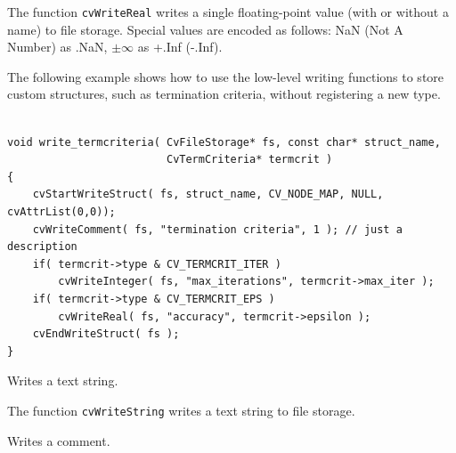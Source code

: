 The function \texttt{cvWriteReal} writes a single floating-point
value (with or without a name) to file storage. Special
values are encoded as follows: NaN (Not A Number) as .NaN, $ \pm \infty $ as +.Inf
(-.Inf).

The following example shows how to use the low-level writing functions
to store custom structures, such as termination criteria, without
registering a new type.

\begin{lstlisting}

void write_termcriteria( CvFileStorage* fs, const char* struct_name,
                         CvTermCriteria* termcrit )
{
    cvStartWriteStruct( fs, struct_name, CV_NODE_MAP, NULL, cvAttrList(0,0));
    cvWriteComment( fs, "termination criteria", 1 ); // just a description
    if( termcrit->type & CV_TERMCRIT_ITER )
        cvWriteInteger( fs, "max_iterations", termcrit->max_iter );
    if( termcrit->type & CV_TERMCRIT_EPS )
        cvWriteReal( fs, "accuracy", termcrit->epsilon );
    cvEndWriteStruct( fs );
}

\end{lstlisting}

\label{WriteString}

Writes a text string.


\begin{description}
\end{description}

The function \texttt{cvWriteString} writes a text string to file storage.

\label{WriteComment}

Writes a comment.

